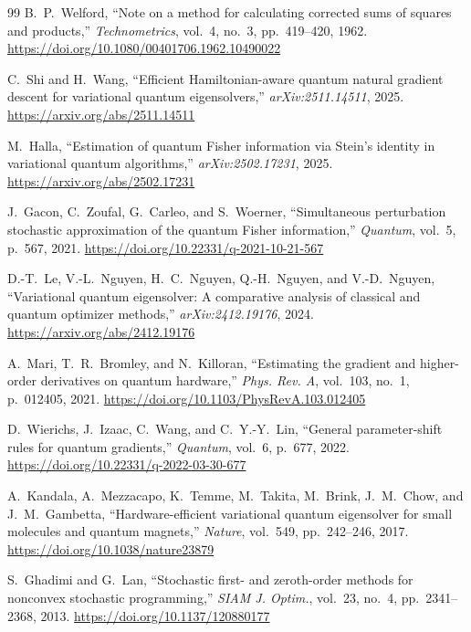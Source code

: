 \documentclass[11pt,a4paper]{article}
\begin{document}
\begin{thebibliography}{99}
B.~P.~Welford,
\newblock ``Note on a method for calculating corrected sums of squares and products,''
\newblock \emph{Technometrics}, vol.~4, no.~3, pp.~419--420, 1962. \url{https://doi.org/10.1080/00401706.1962.10490022}

C.~Shi and H.~Wang,
\newblock ``Efficient Hamiltonian-aware quantum natural gradient descent for variational quantum eigensolvers,''
\newblock \emph{arXiv:2511.14511}, 2025. \url{https://arxiv.org/abs/2511.14511}

M.~Halla,
\newblock ``Estimation of quantum Fisher information via Stein's identity in variational quantum algorithms,''
\newblock \emph{arXiv:2502.17231}, 2025. \url{https://arxiv.org/abs/2502.17231}

J.~Gacon, C.~Zoufal, G.~Carleo, and S.~Woerner,
\newblock ``Simultaneous perturbation stochastic approximation of the quantum Fisher information,''
\newblock \emph{Quantum}, vol.~5, p.~567, 2021. \url{https://doi.org/10.22331/q-2021-10-21-567}

D.-T.~Le, V.-L.~Nguyen, H.~C.~Nguyen, Q.-H.~Nguyen, and V.-D.~Nguyen,
\newblock ``Variational quantum eigensolver: A comparative analysis of classical and quantum optimizer methods,''
\newblock \emph{arXiv:2412.19176}, 2024. \url{https://arxiv.org/abs/2412.19176}

A.~Mari, T.~R.~Bromley, and N.~Killoran,
\newblock ``Estimating the gradient and higher-order derivatives on quantum hardware,''
\newblock \emph{Phys. Rev. A}, vol.~103, no.~1, p.~012405, 2021. \url{https://doi.org/10.1103/PhysRevA.103.012405}

D.~Wierichs, J.~Izaac, C.~Wang, and C.~Y.-Y.~Lin,
\newblock ``General parameter-shift rules for quantum gradients,''
\newblock \emph{Quantum}, vol.~6, p.~677, 2022. \url{https://doi.org/10.22331/q-2022-03-30-677}

A.~Kandala, A.~Mezzacapo, K.~Temme, M.~Takita, M.~Brink, J.~M.~Chow, and J.~M.~Gambetta,
\newblock ``Hardware-efficient variational quantum eigensolver for small molecules and quantum magnets,''
\newblock \emph{Nature}, vol.~549, pp.~242--246, 2017. \url{https://doi.org/10.1038/nature23879}

S.~Ghadimi and G.~Lan,
\newblock ``Stochastic first- and zeroth-order methods for nonconvex stochastic programming,''
\newblock \emph{SIAM J. Optim.}, vol.~23, no.~4, pp.~2341--2368, 2013. \url{https://doi.org/10.1137/120880177}


\end{thebibliography}
\end{document}
